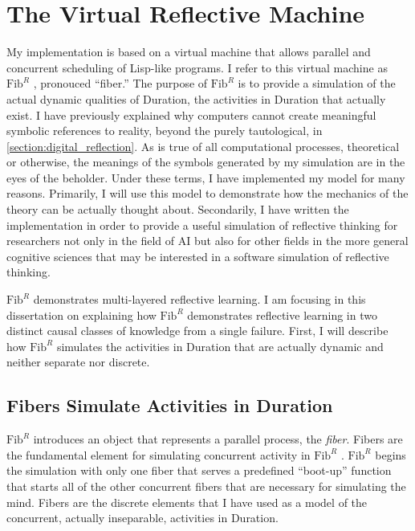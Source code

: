 \chapter{The Virtual Reflective Machine}
\label{chapter:the_virtual_reflective_machine}

\newcommand{\FibR}{$\text{Fib}^R$ }

My implementation is based on a virtual machine that allows parallel
and concurrent scheduling of Lisp-like programs.  I refer to this
virtual machine as \FibR, pronouced ``fiber.''  The purpose of \FibR
is to provide a simulation of the actual dynamic qualities of
Duration, the activities in Duration that actually exist.  I have
previously explained why computers cannot create meaningful symbolic
references to reality, beyond the purely tautological, in
\autoref{section:digital_reflection}.  As is true of all computational
processes, theoretical or otherwise, the meanings of the symbols
generated by my simulation are in the eyes of the beholder.  Under
these terms, I have implemented my model for many reasons.  Primarily,
I will use this model to demonstrate how the mechanics of the theory
can be actually thought about.  Secondarily, I have written the
implementation in order to provide a useful simulation of reflective
thinking for researchers not only in the field of AI but also for
other fields in the more general cognitive sciences that may be
interested in a software simulation of reflective thinking.

\FibR demonstrates multi-layered reflective learning.  I am focusing
in this dissertation on explaining how \FibR demonstrates reflective
learning in two distinct causal classes of knowledge from a single
failure.  First, I will describe how \FibR simulates the activities in
Duration that are actually dynamic and neither separate nor discrete.

\section{Fibers Simulate Activities in Duration}

\FibR introduces an object that represents a parallel process, the
\emph{fiber}.  Fibers are the fundamental element for simulating
concurrent activity in \FibR.  \FibR begins the simulation with only
one fiber that serves a predefined ``boot-up'' function that starts
all of the other concurrent fibers that are necessary for simulating
the mind.  Fibers are the discrete elements that I have used as a
model of the concurrent, actually inseparable, activities in Duration.

